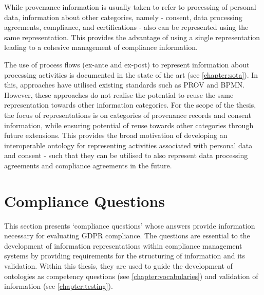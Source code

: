 While provenance information is usually taken to refer to processing of personal data, information about other categories, namely - consent, data processing agreements, compliance, and certifications - also can be represented using the same representation. This provides the advantage of using a single representation leading to a cohesive management of compliance information.

The use of process flows (ex-ante and ex-post) to represent information about processing activities is documented in the state of the art (see \autoref{chapter:sota}). In this, approaches have utilised existing standards such as PROV and BPMN. However, these approaches do not realise the potential to reuse the same representation towards other information categories.
For the scope of the thesis, the focus of representations is on categories of provenance records and consent information, while ensuring potential of reuse towards other categories through future extensions. This provides the broad motivation of developing an interoperable ontology for representing activities associated with personal data and consent - such that they can be utilised to also represent data processing agreements and compliance agreements in the future.

\section{Compliance Questions}\label{sec:info:compliance-questions}
This section presents `compliance questions' whose answers provide information necessary for evaluating GDPR compliance. The questions are essential to the development of information representations within compliance management systems by providing requirements for the structuring of information and its validation. Within this thesis, they are used to guide the development of ontologies as competency questions (see \autoref{chapter:vocabularies}) and validation of information (see \autoref{chapter:testing}).

